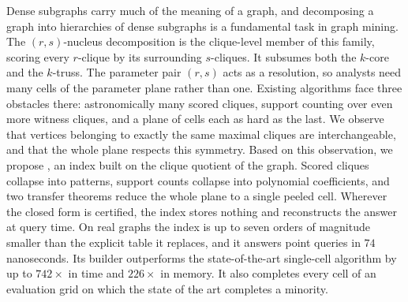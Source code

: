 Dense subgraphs carry much of the meaning of a graph, and decomposing a graph into hierarchies of dense subgraphs is a fundamental task in graph mining.
%
The $(r,s)$-nucleus decomposition is the clique-level member of this family, scoring every $r$-clique by its surrounding $s$-cliques.
%
It subsumes both the $k$-core and the $k$-truss.
%
The parameter pair $(r,s)$ acts as a resolution, so analysts need many cells of the parameter plane rather than one.
%
Existing algorithms face three obstacles there: astronomically many scored cliques, support counting over even more witness cliques, and a plane of cells each as hard as the last.
%
We observe that vertices belonging to exactly the same maximal cliques are interchangeable, and that the whole plane respects this symmetry.
%
Based on this observation, we propose \nsi, an index built on the clique quotient of the graph.
%
Scored cliques collapse into patterns, support counts collapse into polynomial coefficients, and two transfer theorems reduce the whole plane to a single peeled cell.
%
Wherever the closed form is certified, the index stores nothing and reconstructs the answer at query time.
%
On real graphs the index is up to seven orders of magnitude smaller than the explicit table it replaces, and it answers point queries in $74$ nanoseconds.
%
Its builder outperforms the state-of-the-art single-cell algorithm by up to $742\times$ in time and $226\times$ in memory.
%
It also completes every cell of an evaluation grid on which the state of the art completes a minority.

